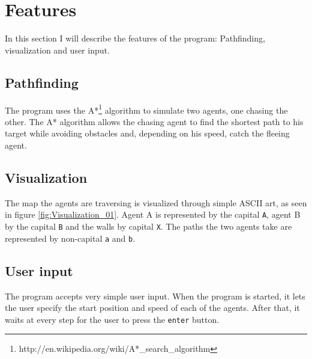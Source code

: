 \section{Features}
\label{02}

In this section I will describe the features of the program: Pathfinding, visualization and user input.

\subsection{Pathfinding}
\label{02_01}

The program uses the A*\footnote{http://en.wikipedia.org/wiki/A*\_search\_algorithm} algorithm to simulate two agents, one chasing the other. The A* algorithm allows the chasing agent to find the shortest path to his target while avoiding obstacles and, depending on his speed, catch the fleeing agent.

\subsection{Visualization}
\label{02_02}

The map the agents are traversing is visualized through simple ASCII art, as seen in figure \ref{fig:Visualization_01}. Agent A is represented by the capital \texttt{A}, agent B by the capital \texttt{B} and the walls by capital \texttt{X}. The paths the two agents take are represented by non-capital \texttt{a} and \texttt{b}.


\subsection{User input}
\label{02_03}

The program accepts very simple user input. When the program is started, it lets the user specify the start position and speed of each of the agents. After that, it waits at every step for the user to press the \texttt{enter} button.